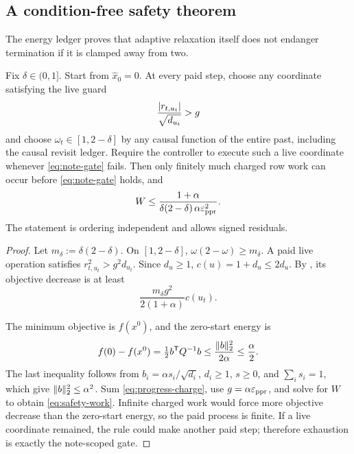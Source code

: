 \subsection{A condition-free safety theorem}

The energy ledger proves that adaptive relaxation itself does not endanger
termination if it is clamped away from two.

\begin{theorem}
\label{thm:safe-adaptive}
Fix $\delta\in(0,1]$.  Start from $\widehat x_0=0$.  At every paid step,
choose any coordinate satisfying the live guard
\begin{equation}
 \frac{\left\lvert r_{t,u_t} \right\rvert}{\sqrt{d_{u_t}}}>g
 \label{eq:live}
\end{equation}
and choose $\omega_t\in[1,2-\delta]$ by any causal function of the entire
past, including the causal revisit ledger.  Require the controller to execute
such a live coordinate whenever \eqref{eq:note-gate} fails.  Then only
finitely much charged row work can occur before \eqref{eq:note-gate} holds,
and
\begin{equation}
 W\leq
 \frac{1+\alpha}
 {\delta(2-\delta)\,\alpha\varepsilon_{\mathrm{ppr}}^{2}}.
 \label{eq:safety-work}
\end{equation}
The statement is ordering independent and allows signed residuals.
\end{theorem}

\begin{proof}
Let $m_\delta:=\delta(2-\delta)$.  On $[1,2-\delta]$,
$\omega(2-\omega)\geq m_\delta$.  A paid live operation satisfies
$r_{t,u_t}^2>g^2d_{u_t}$.  Since $d_u\geq1$,
$c(u)=1+d_u\leq2d_u$.  By , its objective decrease is at
least
\begin{equation}
 \frac{m_\delta g^2}{2(1+\alpha)}c(u_t).
 \label{eq:progress-charge}
\end{equation}

The minimum objective is $f(x^0)$, and the zero-start energy is
\[
 f(0)-f(x^0)=\tfrac12 b^\mathsf TQ^{-1}b
 \leq\frac{\lVert b\rVert_2^2}{2\alpha}
 \leq\frac{\alpha}{2}.
\]
The last inequality follows from
$b_i=\alpha s_i/\sqrt{d_i}$, $d_i\geq1$, $s\geq0$, and
$\sum_i s_i=1$, which give $\lVert b\rVert_2^2\leq\alpha^2$.  Sum
\eqref{eq:progress-charge}, use $g=\alpha\varepsilon_{\mathrm{ppr}}$, and solve for $W$ to
obtain \eqref{eq:safety-work}.  Infinite charged work would force more
objective decrease than the zero-start energy, so the paid process is finite.
If a live coordinate remained, the rule could make another paid step;
therefore exhaustion is exactly the note-scoped gate.
\end{proof}

